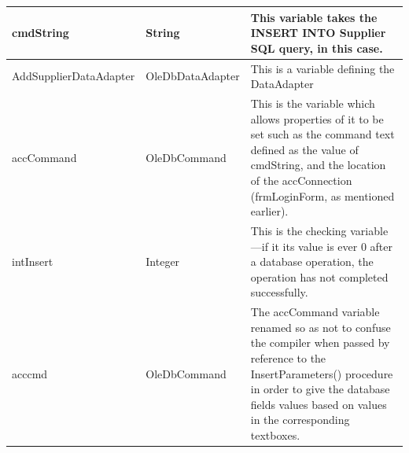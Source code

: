 \begin{longtable}{ | p{4cm} | p{3cm} | p{10cm} |}
		\hline
		cmdString & String & This variable takes the INSERT INTO Supplier SQL query, in this case.\\
		\hline
		AddSupplierDataAdapter & OleDbDataAdapter & This is a variable defining the DataAdapter\\
		\hline
		accCommand & OleDbCommand & This is the variable which allows properties of it to be set such as the command text defined as the value of cmdString, and the location of the accConnection (frmLoginForm, as mentioned earlier).\\
		\hline
		intInsert & Integer & This is the checking variable---if it its value is ever 0 after a database operation, the operation has not completed successfully.\\
		\hline
		acccmd & OleDbCommand & The accCommand variable renamed so as not to confuse the compiler when passed by reference to the InsertParameters() procedure in order to give the database fields values based on values in the corresponding textboxes.\\
		\hline
	\end{longtable}
	
